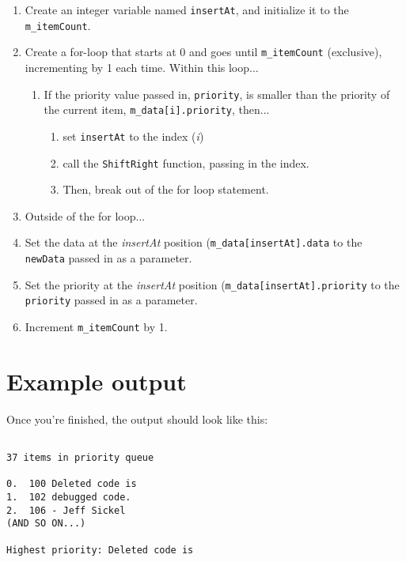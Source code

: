 \documentclass[a4paper,12pt,oneside]{book}
\begin{document}
    \begin{enumerate}
        \item   Create an integer variable named \texttt{insertAt}, and initialize it to
            the \texttt{m\_itemCount}.
        \item   Create a for-loop that starts at 0 and goes until \texttt{m\_itemCount} (exclusive),
            incrementing by 1 each time. Within this loop...
            \begin{enumerate}
                \item   If the priority value passed in, \texttt{priority}, is smaller than the priority of the current item, \texttt{m\_data[i].priority}, then...

                    \begin{enumerate}
                        \item set \texttt{insertAt} to the index (\textit{i})
                        \item call the \texttt{ShiftRight} function, passing in the index.
                        \item Then, break out of the for loop statement.
                    \end{enumerate}
                    
            \end{enumerate}

        \item Outside of the for loop...
        \item   Set the data at the \textit{insertAt} position (\texttt{m\_data[insertAt].data} to the \texttt{newData} passed in as a parameter.
        \item   Set the priority at the \textit{insertAt} position (\texttt{m\_data[insertAt].priority} to the \texttt{priority} passed in as a parameter.
        \item   Increment \texttt{m\_itemCount} by 1.
    \end{enumerate}

    \section{Example output}

    Once you're finished, the output should look like this:

\begin{lstlisting}[style=output]

37 items in priority queue

0. 	100	Deleted code is
1. 	102	debugged code.
2. 	106	- Jeff Sickel
(AND SO ON...)

Highest priority: Deleted code is
\end{lstlisting}

    
        
\end{document}
